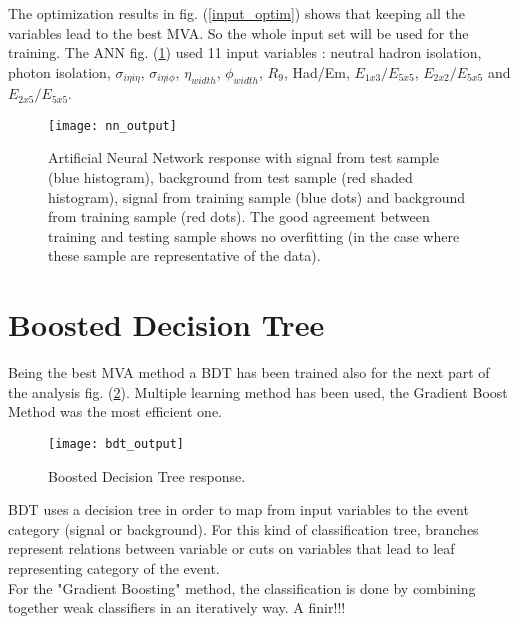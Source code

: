The optimization results in fig. (\ref{input_optim}) shows that keeping all the variables lead to the best MVA. So the whole input set will be used for the training. The ANN fig. (\ref{nn_output}) used 11 input variables : neutral hadron isolation, photon isolation, $\sigma_{i \eta i \eta}$, $\sigma_{i \eta i \phi}$, $\eta_{width}$, $\phi_{width}$, $R_9$, Had/Em, $E_{1x3}/E_{5x5}$, $E_{2x2}/E_{5x5}$ and $E_{2x5}/E_{5x5}$.
 
\begin{figure}[h!]
\centering
    \texttt{[image: nn\_output]}
    \caption{Artificial Neural Network response with signal from test sample (blue histogram), background from test
    sample (red shaded histogram), signal from training sample (blue dots) and background from training sample (red
    dots). The good agreement between training and testing sample shows no overfitting (in the case where these sample
    are representative of the data).}
    \label{nn_output}
\end{figure}

\section{Boosted Decision Tree}

Being the best MVA method a BDT has been trained also for the next part of the analysis fig. (\ref{bdt_output}).
Multiple learning method has been used, the Gradient Boost Method was the most efficient one.
\begin{figure}[h!]
\centering
    \texttt{[image: bdt\_output]}
    \caption{Boosted Decision Tree response.}
    \label{bdt_output}
\end{figure}


BDT uses a decision tree in order to map from input variables to the event category (signal or background).
For this kind of classification tree, branches represent relations between variable or cuts on variables that lead to leaf representing category of the event.\\
For the "Gradient Boosting" method, the classification is done by combining together weak classifiers in an iteratively way.
A finir!!!


